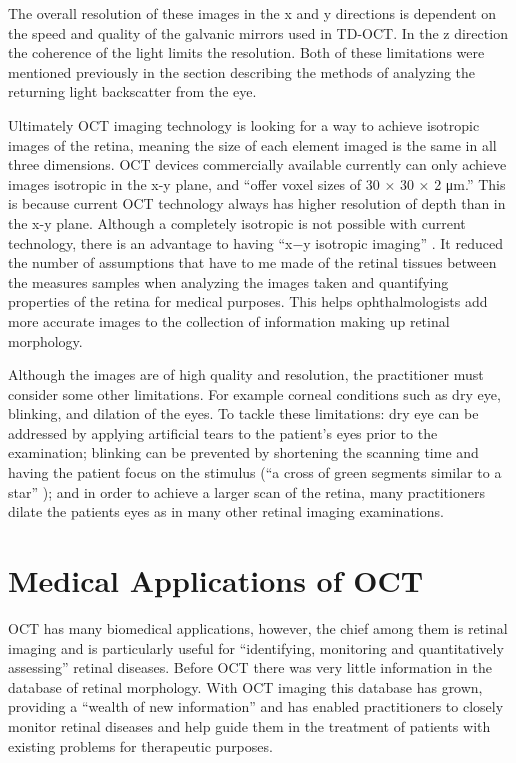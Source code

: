 The overall resolution of these images in the x and y directions is dependent on the speed and quality of the galvanic mirrors used in TD-OCT.  In the z direction the coherence of the light limits the resolution.  Both of these limitations were mentioned previously in the section describing the methods of analyzing the returning light backscatter from the eye.

Ultimately OCT imaging technology is looking for a way to achieve isotropic images of the retina, meaning the size of each element imaged is the same in all three dimensions.  OCT devices commercially available currently can only achieve images isotropic in the x-y plane, and “offer voxel sizes of 30 × 30 × 2 μm.” \cite{} This is because current OCT technology always has higher resolution of depth than in the x-y plane. \cite{}  Although a completely isotropic is not possible with current technology, there is an advantage to having “x−y isotropic imaging” \cite{}.  It reduced the number of assumptions that have to me made of the retinal tissues between the measures samples when analyzing the images taken and quantifying properties of the retina for medical purposes. \cite{} This helps ophthalmologists add more accurate images to the collection of information making up retinal morphology.

Although the images are of high quality and resolution, the practitioner must consider some other limitations.  For example corneal conditions such as dry eye, blinking, and dilation of the eyes.  To tackle these limitations: dry eye can be addressed by applying artificial tears to the patient’s eyes prior to the examination; blinking can be prevented by shortening the scanning time and having the patient focus on the stimulus (“a cross of green segments similar to a star” \cite{} ); and in order to achieve a larger scan of the retina, many practitioners dilate the patients eyes as in many other retinal imaging examinations. 

\section{Medical Applications of OCT}
OCT has many biomedical applications, however, the chief among them is retinal imaging and is particularly useful for “identifying, monitoring and quantitatively assessing” \cite{} retinal diseases. \cite{} \cite{}  Before OCT there was very little information in the database of retinal morphology.  With OCT imaging this database has grown, providing a “wealth of new information” \cite{} and has enabled practitioners to closely monitor retinal diseases and help guide them in the treatment of patients with existing problems for therapeutic purposes.  


